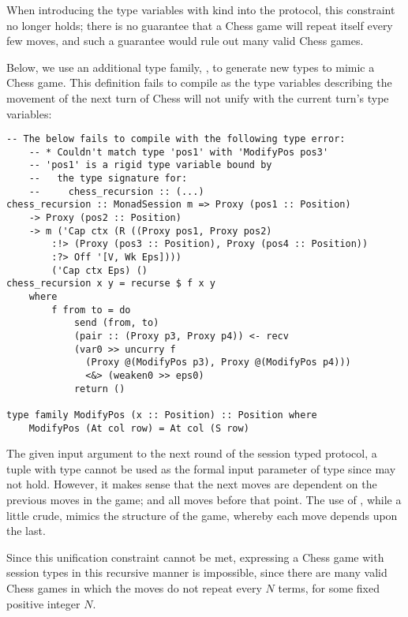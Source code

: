 When introducing the type variables with kind  into the protocol, this constraint no longer holds; there is no guarantee that a Chess game will repeat itself every few moves, and such a guarantee would rule out many valid Chess games.

Below, we use an additional type family, , to generate new  types to mimic a Chess game. This definition fails to compile as the type variables describing the movement of the next turn of Chess will not unify with the current turn's type variables:

\begin{lstlisting}
-- The below fails to compile with the following type error:
    -- * Couldn't match type 'pos1' with 'ModifyPos pos3'
    -- 'pos1' is a rigid type variable bound by
    --   the type signature for:
    --     chess_recursion :: (...)
chess_recursion :: MonadSession m => Proxy (pos1 :: Position)
    -> Proxy (pos2 :: Position)
    -> m ('Cap ctx (R ((Proxy pos1, Proxy pos2)
        :!> (Proxy (pos3 :: Position), Proxy (pos4 :: Position))
        :?> Off '[V, Wk Eps])))
        ('Cap ctx Eps) ()
chess_recursion x y = recurse $ f x y
    where
        f from to = do
            send (from, to)
            (pair :: (Proxy p3, Proxy p4)) <- recv
            (var0 >> uncurry f
              (Proxy @(ModifyPos p3), Proxy @(ModifyPos p4)))
              <&> (weaken0 >> eps0)
            return ()

type family ModifyPos (x :: Position) :: Position where
    ModifyPos (At col row) = At col (S row)
\end{lstlisting}

The given input argument to the next round of the session typed protocol, a tuple with type  cannot be used as the formal input parameter of type  since  may not hold. However, it makes sense that the next moves are dependent on the previous moves in the game; and all moves before that point. The use of , while a little crude, mimics the structure of the game, whereby each move depends upon the last.

Since this unification constraint cannot be met, expressing a Chess game with session types in this recursive manner is impossible, since there are many valid Chess games in which the moves do not repeat every $N$ terms, for some fixed positive integer $N$.

